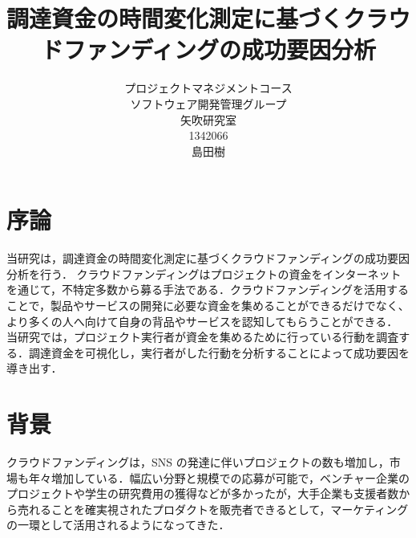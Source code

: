 \title{調達資金の時間変化測定に基づくクラウドファンディングの成功要因分析}
\author{プロジェクトマネジメントコース\\
ソフトウェア開発管理グループ\\
矢吹研究室\\
1342066\\
島田樹}
\date{}

\maketitle



\tableofcontents%


\chapter{序論}
当研究は，調達資金の時間変化測定に基づくクラウドファンディングの成功要因分析を行う．
クラウドファンディングはプロジェクトの資金をインターネットを通じて，不特定多数から募る手法である．クラウドファンディングを活用することで，製品やサービスの開発に必要な資金を集めることができるだけでなく、より多くの人へ向けて自身の背品やサービスを認知してもらうことができる．
当研究では，プロジェクト実行者が資金を集めるために行っている行動を調査する．調達資金を可視化し，実行者がした行動を分析することによって成功要因を導き出す．

\chapter{背景}
クラウドファンディングは，SNS の発達に伴いプロジェクトの数も増加し，市場も年々増加している\cite{visualizing}．幅広い分野と規模での応募が可能で，ベンチャー企業のプロジェクトや学生の研究費用の獲得などが多かったが，大手企業も支援者数から売れることを確実視されたプロダクトを販売者できるとして，マーケティングの一環として活用されるようになってきた．



